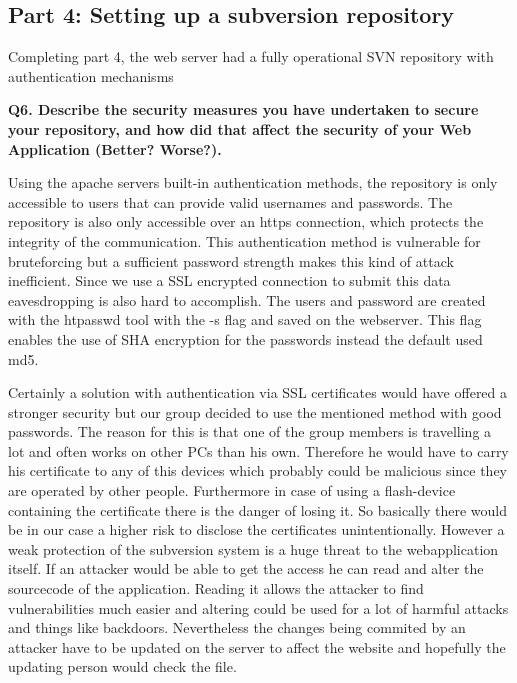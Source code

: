 \subsection {Part 4: Setting up a subversion repository}
Completing part 4, the web server had a fully operational SVN repository with authentication mechanisms
\newline

\noindent
{\bf Q6. Describe the security measures you have undertaken to secure your
repository, and how did that affect the security of your Web Application
(Better? Worse?).}
\newline

\noindent
Using the apache servers built-in authentication methods, the repository is only accessible to users that can provide valid usernames and passwords. The repository is also only accessible over an https connection, which protects the integrity of the communication. This authentication method is vulnerable for bruteforcing but a sufficient password strength makes this kind of attack inefficient. Since we use a SSL encrypted connection to submit this data eavesdropping is also hard to accomplish. The users and password are created with the htpasswd tool with the -s flag and saved on the webserver.  This flag enables the use of SHA encryption for the passwords instead the default used md5.
\newline

\noindent
Certainly a solution with authentication via SSL certificates would have offered a stronger security but our group decided to use the mentioned method with good passwords. The reason for this is that one of the group members is travelling a lot and often works on other PCs than his own. Therefore he would have to carry his certificate to any of this devices which probably could be malicious since they are operated by other people. Furthermore in case of using a flash-device containing the certificate there is the danger of losing it.
So basically there would be in our case a higher risk to disclose the certificates unintentionally.
However a weak protection of the subversion system is a huge threat to the webapplication itself. If an attacker would be able to get the access he can read and alter the sourcecode of the application. Reading it allows the attacker to find vulnerabilities much easier and altering could be used for a lot of harmful attacks and things like backdoors. Nevertheless the changes being commited by an attacker have to be updated on the server to affect the website and hopefully the updating person would check the file.


